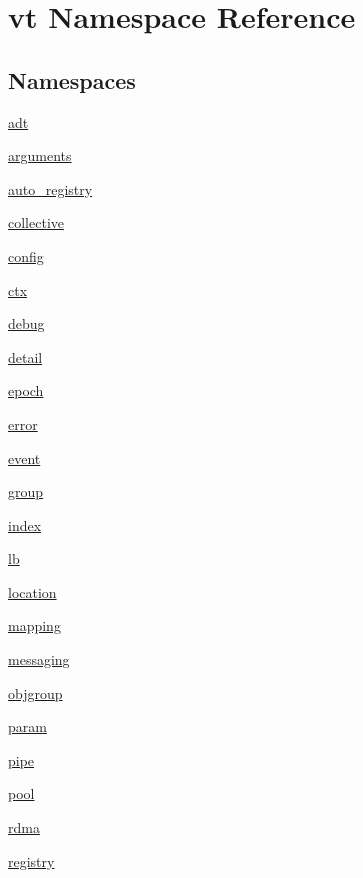 \hypertarget{namespacevt}{}\section{vt Namespace Reference}
\label{namespacevt}
\subsection*{Namespaces}
\begin{DoxyCompactItemize}
\item 
 \hyperlink{namespacevt_1_1adt}{adt}
\item 
 \hyperlink{namespacevt_1_1arguments}{arguments}
\item 
 \hyperlink{namespacevt_1_1auto__registry}{auto\+\_\+registry}
\item 
 \hyperlink{namespacevt_1_1collective}{collective}
\item 
 \hyperlink{namespacevt_1_1config}{config}
\item 
 \hyperlink{namespacevt_1_1ctx}{ctx}
\item 
 \hyperlink{namespacevt_1_1debug}{debug}
\item 
 \hyperlink{namespacevt_1_1detail}{detail}
\item 
 \hyperlink{namespacevt_1_1epoch}{epoch}
\item 
 \hyperlink{namespacevt_1_1error}{error}
\item 
 \hyperlink{namespacevt_1_1event}{event}
\item 
 \hyperlink{namespacevt_1_1group}{group}
\item 
 \hyperlink{namespacevt_1_1index}{index}
\item 
 \hyperlink{namespacevt_1_1lb}{lb}
\item 
 \hyperlink{namespacevt_1_1location}{location}
\item 
 \hyperlink{namespacevt_1_1mapping}{mapping}
\item 
 \hyperlink{namespacevt_1_1messaging}{messaging}
\item 
 \hyperlink{namespacevt_1_1objgroup}{objgroup}
\item 
 \hyperlink{namespacevt_1_1param}{param}
\item 
 \hyperlink{namespacevt_1_1pipe}{pipe}
\item 
 \hyperlink{namespacevt_1_1pool}{pool}
\item 
 \hyperlink{namespacevt_1_1rdma}{rdma}
\item 
 \hyperlink{namespacevt_1_1registry}{registry}
\item 

\end{DoxyCompactItemize}

